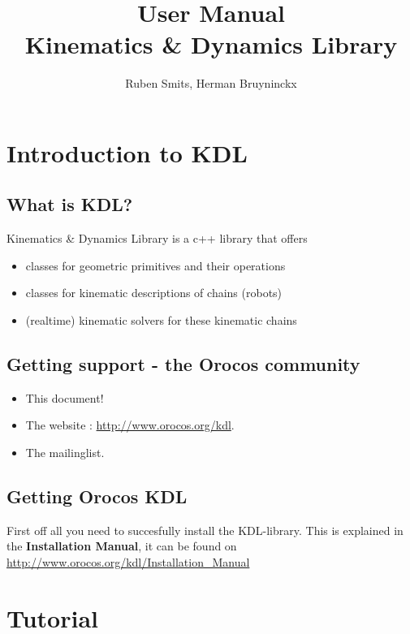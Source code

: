 \documentclass[a4paper,10pt]{report}
\title{User Manual \\ Kinematics \& Dynamics Library}
\author{Ruben Smits, Herman Bruyninckx}
\begin{document}
\lstset{language=c++}

\maketitle

\chapter{Introduction to KDL}
\label{cha:introduction-kdl}

\section{What is KDL?}
\label{sec:what-kdl}
Kinematics \& Dynamics Library is a c++ library that offers

\begin{itemize}
\item classes for geometric primitives and their operations
\item classes for kinematic descriptions of chains (robots)
\item (realtime) kinematic solvers for these kinematic chains
\end{itemize}

\section{Getting support - the Orocos community}
\label{sec:gett-supp-oroc}

\begin{itemize}
\item This document!
\item The website : \url{http://www.orocos.org/kdl}.
\item The mailinglist. 
\end{itemize}


\section{Getting Orocos KDL}
\label{sec:getting-orocos-kdl}

First off all you need to succesfully install the KDL-library. This is
explained in the \textbf{Installation Manual}, it can be found on
\url{http://www.orocos.org/kdl/Installation_Manual}


\chapter{Tutorial}
\label{cha:tutorial}
\end{document}
